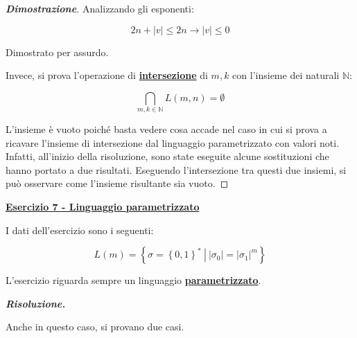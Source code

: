 \documentclass[a4paper]{article}
\begin{document}
\begin{proof}[\textcolor{Blue3}{\textbf{Dimostrazione}}]
		\noindent
		Analizzando gli esponenti:
		
		\begin{equation*}
			2n + |v| \le 2n \longrightarrow |v| \le 0
		\end{equation*}
	
		\noindent
		Dimostrato per assurdo.
		
		\newpage
		
		\noindent
		Invece, si prova l'operazione di \textbf{\underline{intersezione}} di $m,k$ con l'insieme dei naturali $\mathbb{N}$:
		
		\begin{equation*}
			\bigcap_{m,k \in \mathbb{N}} L\left(m,n\right) = \emptyset
		\end{equation*}
	
		\noindent
		L'insieme è vuoto poiché basta vedere cosa accade nel caso in cui si prova a ricavare l'insieme di intersezione dal linguaggio parametrizzato con valori noti. Infatti, all'inizio della risoluzione, sono state eseguite alcune sostituzioni che hanno portato a due risultati. Eseguendo l'intersezione tra questi due insiemi, si può osservare come l'insieme risultante sia vuoto.
	\end{proof}

	\newpage
	
	\noindent
	\textcolor{Red3}{\textbf{\underline{Esercizio 7 - Linguaggio parametrizzato}}}\newline
	
	\noindent
	I dati dell'esercizio sono i seguenti:
	
	\begin{equation*}
		L\left(m\right) = \left\{\sigma = \left\{0,1\right\}^{*} \: \left| \: |\sigma_{0}| = |\sigma_{1}|^{m} \right.\right\}
	\end{equation*}\newline
	
	\noindent
	L'esercizio riguarda sempre un linguaggio \textbf{\underline{parametrizzato}}.\newline
	
	\noindent
	\textcolor{Green4}{\textbf{\emph{Risoluzione.}}}\newline
	
	\noindent
	Anche in questo caso, si provano due casi.
	
\end{document}
